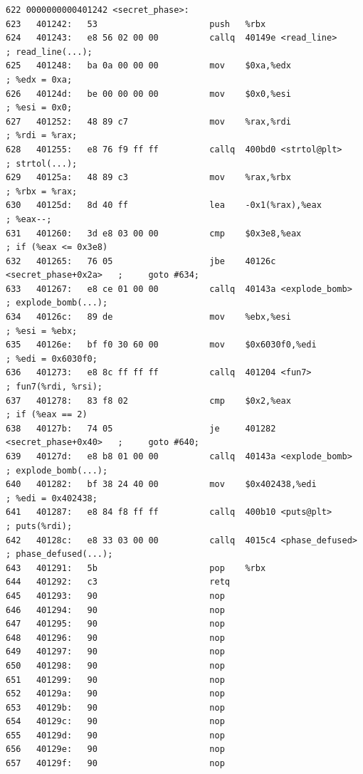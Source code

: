 \documentclass{article}
\begin{document}
\begin{lstlisting}[title = secret\_phase对应的反汇编代码及注释, xleftmargin = 2em,xrightmargin = 2em, aboveskip = 1em, numbers = none, basicstyle=\footnotesize\ttfamily]
622 0000000000401242 <secret_phase>:
623   401242:   53                      push   %rbx
624   401243:   e8 56 02 00 00          callq  40149e <read_line>           ; read_line(...);
625   401248:   ba 0a 00 00 00          mov    $0xa,%edx                    ; %edx = 0xa;
626   40124d:   be 00 00 00 00          mov    $0x0,%esi                    ; %esi = 0x0;
627   401252:   48 89 c7                mov    %rax,%rdi                    ; %rdi = %rax;
628   401255:   e8 76 f9 ff ff          callq  400bd0 <strtol@plt>          ; strtol(...);
629   40125a:   48 89 c3                mov    %rax,%rbx                    ; %rbx = %rax;
630   40125d:   8d 40 ff                lea    -0x1(%rax),%eax              ; %eax--;
631   401260:   3d e8 03 00 00          cmp    $0x3e8,%eax                  ; if (%eax <= 0x3e8)
632   401265:   76 05                   jbe    40126c <secret_phase+0x2a>   ;     goto #634;
633   401267:   e8 ce 01 00 00          callq  40143a <explode_bomb>        ; explode_bomb(...);
634   40126c:   89 de                   mov    %ebx,%esi                    ; %esi = %ebx;
635   40126e:   bf f0 30 60 00          mov    $0x6030f0,%edi               ; %edi = 0x6030f0;
636   401273:   e8 8c ff ff ff          callq  401204 <fun7>                ; fun7(%rdi, %rsi);
637   401278:   83 f8 02                cmp    $0x2,%eax                    ; if (%eax == 2)
638   40127b:   74 05                   je     401282 <secret_phase+0x40>   ;     goto #640;
639   40127d:   e8 b8 01 00 00          callq  40143a <explode_bomb>        ; explode_bomb(...);
640   401282:   bf 38 24 40 00          mov    $0x402438,%edi               ; %edi = 0x402438;
641   401287:   e8 84 f8 ff ff          callq  400b10 <puts@plt>            ; puts(%rdi);
642   40128c:   e8 33 03 00 00          callq  4015c4 <phase_defused>       ; phase_defused(...);
643   401291:   5b                      pop    %rbx
644   401292:   c3                      retq
645   401293:   90                      nop
646   401294:   90                      nop
647   401295:   90                      nop
648   401296:   90                      nop                                                               
649   401297:   90                      nop
650   401298:   90                      nop
651   401299:   90                      nop
652   40129a:   90                      nop
653   40129b:   90                      nop
654   40129c:   90                      nop
655   40129d:   90                      nop
656   40129e:   90                      nop
657   40129f:   90                      nop
  \end{lstlisting}
\end{document}
